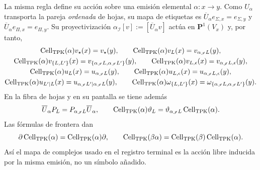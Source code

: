 La misma regla define su acción sobre una emisión elemental
\(\alpha:x\to y\). Como \(U_\alpha\) transporta la pareja \emph{ordenada}
de hojas, su mapa de etiquetas es
\(\overline U_\alpha e_{\Sigma,x}=e_{\Sigma,y}\) y
\(\overline U_\alpha e_{\Pi,x}=e_{\Pi,y}\). Su proyectivización
\(\alpha_{\mathscr I}[v]:=[\overline U_\alpha v]\) actúa en
\(\mathbf P^1(V_x)\) y, por tanto,
\begin{equation}
\label{rm:eq:pdfv2-cor-cell-accion-emision}
 \begin{gathered}
 \operatorname{Cell}_{\rm TPK}(\alpha)v_\star(x)=v_\star(y),\qquad
 \operatorname{Cell}_{\rm TPK}(\alpha)v_L(x)
   =v_{\alpha_{\mathscr I}L}(y),\\
 \operatorname{Cell}_{\rm TPK}(\alpha)v_{\{L,L'\}}(x)
   =v_{\{\alpha_{\mathscr I}L,\alpha_{\mathscr I}L'\}}(y),\qquad
 \operatorname{Cell}_{\rm TPK}(\alpha)v_{L,\epsilon}(x)
   =v_{\alpha_{\mathscr I}L,\epsilon}(y),\\
 \operatorname{Cell}_{\rm TPK}(\alpha)u_L(x)
   =u_{\alpha_{\mathscr I}L}(y),\qquad
 \operatorname{Cell}_{\rm TPK}(\alpha)u_{L,\epsilon}(x)
   =u_{\alpha_{\mathscr I}L,\epsilon}(y),\\
 \operatorname{Cell}_{\rm TPK}(\alpha)u_{L'\mid L}(x)
   =u_{\alpha_{\mathscr I}L'\mid\alpha_{\mathscr I}L}(y),\qquad
 \operatorname{Cell}_{\rm TPK}(\alpha)\omega_{\{L,L'\}}(x)
   =\omega_{\{\alpha_{\mathscr I}L,
                 \alpha_{\mathscr I}L'\}}(y).
 \end{gathered}
\end{equation}
En la fibra de hojas y en su pantalla se tiene además
\begin{equation}
\label{rm:eq:pdfv2-cor-cell-entrelaza-proyectores-pantalla}
 \overline U_\alpha P_L=P_{\alpha_{\mathscr I}L}\overline U_\alpha,
 \qquad
 \operatorname{Cell}_{\rm TPK}(\alpha)\vartheta_L
 =\vartheta_{\alpha_{\mathscr I}L}
  \operatorname{Cell}_{\rm TPK}(\alpha).
\end{equation}
Las fórmulas de frontera dan
\begin{equation}
\label{rm:eq:pdfv2-cor-cell-accion-emision-natural}
 \partial\operatorname{Cell}_{\rm TPK}(\alpha)
 =\operatorname{Cell}_{\rm TPK}(\alpha)\partial,\qquad
 \operatorname{Cell}_{\rm TPK}(\beta\alpha)
 =\operatorname{Cell}_{\rm TPK}(\beta)
  \operatorname{Cell}_{\rm TPK}(\alpha).
\end{equation}
Así el mapa de complejos usado en el registro terminal es la acción libre
inducida por la misma emisión, no un símbolo añadido.

